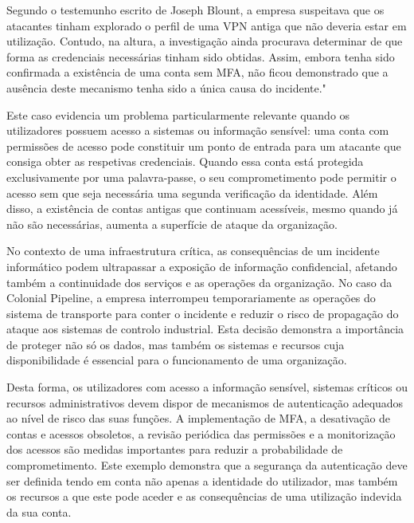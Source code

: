 \hspace{1cm} Segundo o testemunho escrito de Joseph Blount, a empresa suspeitava que os atacantes tinham explorado o perfil de uma VPN antiga que não deveria estar em utilização. Contudo, na altura, a investigação ainda procurava determinar de que forma as credenciais necessárias tinham sido obtidas. Assim, embora tenha sido confirmada a existência de uma conta sem MFA, não ficou demonstrado que a ausência deste mecanismo tenha sido a única causa do incidente."

\hspace{1cm} Este caso evidencia um problema particularmente relevante quando os utilizadores possuem acesso a sistemas ou informação sensível: uma conta com permissões de acesso pode constituir um ponto de entrada para um atacante que consiga obter as respetivas credenciais. Quando essa conta está protegida exclusivamente por uma palavra-passe, o seu comprometimento pode permitir o acesso sem que seja necessária uma segunda verificação da identidade. Além disso, a existência de contas antigas que continuam acessíveis, mesmo quando já não são necessárias, aumenta a superfície de ataque da organização.

\hspace{1cm} No contexto de uma infraestrutura crítica, as consequências de um incidente informático podem ultrapassar a exposição de informação confidencial, afetando também a continuidade dos serviços e as operações da organização. No caso da Colonial Pipeline, a empresa interrompeu temporariamente as operações do sistema de transporte para conter o incidente e reduzir o risco de propagação do ataque aos sistemas de controlo industrial. Esta decisão demonstra a importância de proteger não só os dados, mas também os sistemas e recursos cuja disponibilidade é essencial para o funcionamento de uma organização.

\hspace{1cm} Desta forma, os utilizadores com acesso a informação sensível, sistemas críticos ou recursos administrativos devem dispor de mecanismos de autenticação adequados ao nível de risco das suas funções. A implementação de MFA, a desativação de contas e acessos obsoletos, a revisão periódica das permissões e a monitorização dos acessos são medidas importantes para reduzir a probabilidade de comprometimento. Este exemplo demonstra que a segurança da autenticação deve ser definida tendo em conta não apenas a identidade do utilizador, mas também os recursos a que este pode aceder e as consequências de uma utilização indevida da sua conta.

